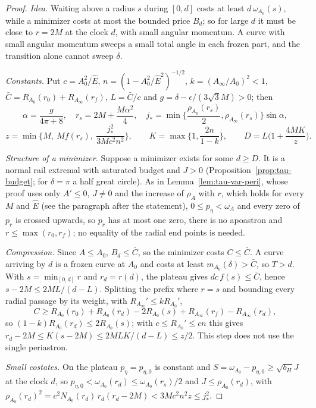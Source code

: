 \documentclass[aip,jmp,amsmath,amssymb,reprint]{revtex4-2}
\newcommand{\Ehat}{\hat E}
\theoremstyle{plain}
\theoremstyle{definition}
\begin{document}
\begin{proof}
\emph{Idea.} Waiting above a radius $s$ during $[0,d]$ costs at least $d\,\omega_{A_0}(s)$, while a minimizer
costs at most the bounded price $B_d$; so for large $d$ it must be close to $r=2M$ at the clock $d$,
with small angular momentum. A curve with small angular momentum sweeps a small total angle in each
frozen part, and the transition alone cannot sweep $\delta$.

\emph{Constants.} Put $c=A_0^2/\Ehat$, $n=(1-A_0^2/\Ehat^2)^{-1/2}$, $k=(A_\infty/A_0)^2<1$,
$\bar C=R_{A_0}(r_0)+R_{A_\infty}(r_f)$, $L=\bar C/c$ and $g=\delta-\epsilon/(3\sqrt3M)>0$; then
\[
  \alpha=\frac g{4\pi+8},\quad r_s=2M+\frac{M\alpha^2}4,\quad
  j_*=\min\Big\{\frac{\rho_{A_0}(r_s)}2,\rho_{A_\infty}(r_s)\Big\}\sin\alpha,
\]
\[
  z=\min\Big\{M,\ Mf(r_s),\ \frac{j_*^2}{3Mc^2n^2}\Big\},\qquad K=\max\Big\{1,\frac{2n}{1-k}\Big\},\qquad
  D=L\Big(1+\frac{4MK}z\Big).
\]

\emph{Structure of a minimizer.} Suppose a minimizer exists for some $d\ge D$. It is a normal rail
extremal with saturated budget and $J>0$ (Proposition~\ref{prop:tau-budget}; for $\delta=\pi$ a half great
circle). As in Lemma~\ref{lem:tau-var-peri}, whose proof uses only $A'\le0$, $J\ne0$ and the increase of $\rho_A$ with $r$,
which holds for every $M$ and $\Ehat$ (see the paragraph after the statement), $0\le p_\eta<\omega_A$ and every zero of
$p_r$ is crossed upwards, so
$p_r$ has at most one zero, there is no apoastron and $r\le\max(r_0,r_f)$; no equality of the radial end
points is needed.

\emph{Compression.} Since $A\le A_0$, $B_d\le\bar C$, so the minimizer costs $C\le\bar C$. A curve arriving by $d$
is a frozen curve at $A_0$ and costs at least $m_{A_0}(\delta)>\bar C$, so $T>d$. With $s=\min_{[0,d]}r$ and
$r_d=r(d)$, the plateau gives $dc\,f(s)\le\bar C$, hence $s-2M\le2ML/(d-L)$. Splitting the prefix where $r=s$
and bounding every radial passage by its weight, with $R_{A_\infty}'\le kR_{A_0}'$,
\[
  C\ge R_{A_0}(r_0)+R_{A_0}(r_d)-2R_{A_0}(s)+R_{A_\infty}(r_f)-R_{A_\infty}(r_d),
\]
so $(1-k)R_{A_0}(r_d)\le2R_{A_0}(s)$; with $c\le R_{A_0}'\le cn$ this gives
$r_d-2M\le K(s-2M)\le2MLK/(d-L)\le z/2$. This step does not use the single periastron.

\emph{Small costates.} On the plateau $p_\eta=p_{\eta,0}$ is constant and $S=\omega_{A_0}-p_{\eta,0}\ge\sqrt{b_H}J$ at the clock $d$,
so $p_{\eta,0}<\omega_{A_0}(r_d)\le\omega_{A_0}(r_s)/2$ and $J\le\rho_{A_0}(r_d)$, with
$\rho_{A_0}(r_d)^2=c^2N_{A_0}(r_d)\,r_d(r_d-2M)<3Mc^2n^2z\le j_*^2$.


\end{proof}
\end{document}
